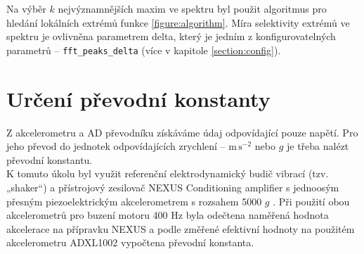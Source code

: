     Na výběr $k$ nejvýznamnějších maxim ve spektru byl použit algoritmus pro hledání lokálních extrémů funkce \ref{figure:algorithm}.
    Míra selektivity extrémů ve spektru je ovlivněna parametrem delta, který je jedním z konfigurovatelných parametrů – \texttt{fft\_peaks\_delta} (více v kapitole \ref{section:config}).
    
   
    
 
    
    \section{Určení převodní konstanty}
        Z akcelerometru a AD převodníku získáváme údaj odpovídající pouze napětí. Pro jeho převod do jednotek odpovídajících zrychlení  – $\mathrm{m\,s^{-2}}$ nebo $g$ je třeba nalézt převodní konstantu.\\
        K tomuto úkolu byl využit referenční elektrodynamický budič vibrací (tzv. „shaker“) a přístrojový zesilovač NEXUS Conditioning amplifier s jednoosým přesným piezoelektrickým akcelerometrem s rozsahem 5000 $g$ \cite{manual:2}. Při použití obou akcelerometrů pro buzení motoru 400 Hz byla odečtena naměřená hodnota akcelerace na přípravku NEXUS a podle změřené efektivní hodnoty na použitém akcelerometru ADXL1002 vypočtena převodní konstanta.
        
